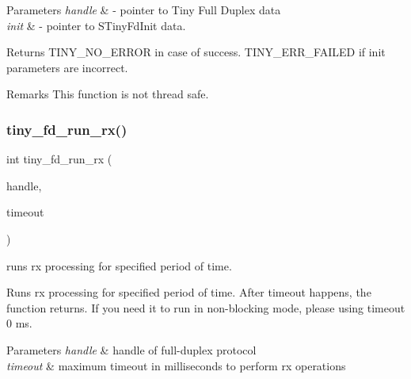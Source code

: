 \begin{DoxyParams}{Parameters}
{\em handle} & -\/ pointer to Tiny Full Duplex data \\
\hline
{\em init} & -\/ pointer to S\+Tiny\+Fd\+Init data. \\
\hline
\end{DoxyParams}
\begin{DoxyReturn}{Returns}
T\+I\+N\+Y\+\_\+\+N\+O\+\_\+\+E\+R\+R\+OR in case of success. T\+I\+N\+Y\+\_\+\+E\+R\+R\+\_\+\+F\+A\+I\+L\+ED if init parameters are incorrect. 
\end{DoxyReturn}
\begin{DoxyRemark}{Remarks}
This function is not thread safe. 
\end{DoxyRemark}
\mbox{\label{group__FULL__DUPLEX__API_gad31f944514aef01e27bc3ec67fdbe140}} 
\subsubsection{\texorpdfstring{tiny\+\_\+fd\+\_\+run\+\_\+rx()}{tiny\_fd\_run\_rx()}}
{\footnotesize\ttfamily int tiny\+\_\+fd\+\_\+run\+\_\+rx (\begin{DoxyParamCaption}\item[{\hyperlink{tiny__fd_8h_a91e6b79431fe38570fb102701ef0b7e8}{tiny\+\_\+fd\+\_\+handle\+\_\+t}}]{handle,  }\item[{uint16\+\_\+t}]{timeout }\end{DoxyParamCaption})}



runs rx processing for specified period of time. 

Runs rx processing for specified period of time. After timeout happens, the function returns. If you need it to run in non-\/blocking mode, please using timeout 0 ms.


\begin{DoxyParams}{Parameters}
{\em handle} & handle of full-\/duplex protocol \\
\hline
{\em timeout} & maximum timeout in milliseconds to perform rx operations \\
\hline
\end{DoxyParams}
\mbox{\label{group__FULL__DUPLEX__API_ga601c9874a570331580856c1ea28f7914}} 
